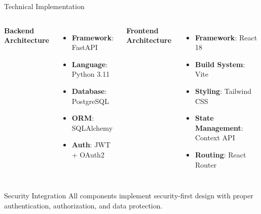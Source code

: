 \documentclass[aspectratio=169]{beamer}
\begin{document}
\begin{frame}{Technical Implementation}
\begin{columns}
\textbf{Backend Architecture}
\begin{itemize}
    \item \textbf{Framework}: FastAPI
    \item \textbf{Language}: Python 3.11
    \item \textbf{Database}: PostgreSQL
    \item \textbf{ORM}: SQLAlchemy
    \item \textbf{Auth}: JWT + OAuth2
\end{itemize}

\textbf{Frontend Architecture}
\begin{itemize}
    \item \textbf{Framework}: React 18
    \item \textbf{Build System}: Vite
    \item \textbf{Styling}: Tailwind CSS
    \item \textbf{State Management}: Context API
    \item \textbf{Routing}: React Router
\end{itemize}
\end{columns}

\vspace{0.3cm}
\begin{block}{Security Integration}
All components implement security-first design with proper authentication, authorization, and data protection.
\end{block}
\end{frame}
\end{document}
